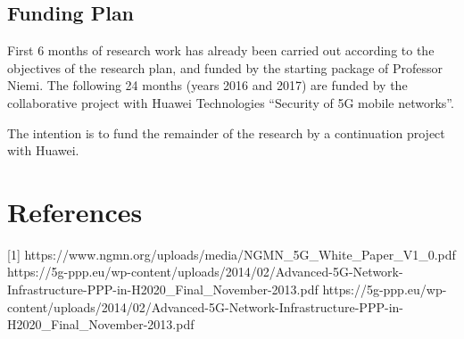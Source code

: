 \documentclass[14pt]{article}
\begin{document}
\begin{enumerate}
\section*{Funding Plan}
First 6 months of research work has already been carried out according to the objectives of the research plan, and funded by the starting package of Professor Niemi. The following 24 months (years 2016 and 2017) are funded by the collaborative project with Huawei Technologies \enquote{Security of 5G mobile networks}.

The intention is to fund the remainder of the research by a continuation project with Huawei.

\end{enumerate}

\section{References}
[1] https://www.ngmn.org/uploads/media/NGMN\_5G\_White\_Paper\_V1\_0.pdf \newline\newline
[2] https://5g-ppp.eu/wp-content/uploads/2014/02/Advanced-5G-Network-Infrastructure-PPP-in-H2020\_Final\_November-2013.pdf \newline\newline
[2] https://5g-ppp.eu/wp-content/uploads/2014/02/Advanced-5G-Network-Infrastructure-PPP-in-H2020\_Final\_November-2013.pdf \newline\newline
\end{document}
